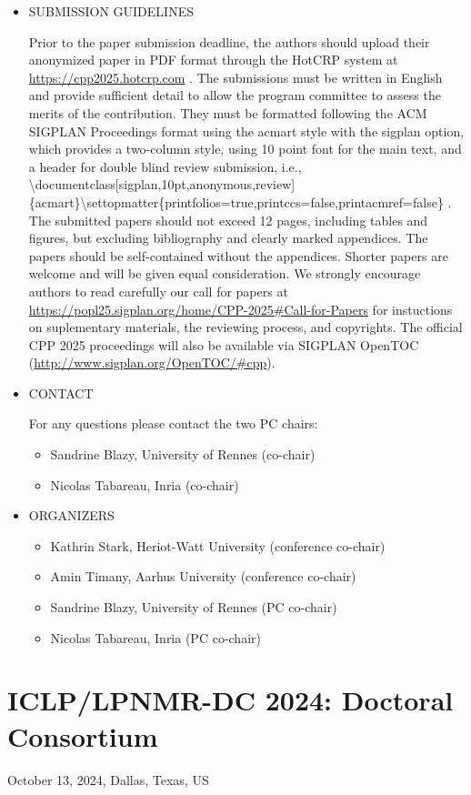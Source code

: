 \documentclass[prodmode,acmtecs]{acmsmall} %
\begin{document}
\begin{itemize}
\item  SUBMISSION GUIDELINES 
 
  Prior to the paper submission deadline, the authors should upload their anonymized paper in PDF format through the HotCRP system at \href{https://cpp2025.hotcrp.com}{https://cpp2025.hotcrp.com} . The submissions must be written in English and provide sufficient detail to allow the program committee to assess the merits of the contribution. They must be formatted following the ACM SIGPLAN Proceedings format using the acmart style with the sigplan option, which provides a two-column style, using 10 point font for the main text, and a header for double blind review submission, i.e., \textbackslash{}documentclass[sigplan,10pt,anonymous,review]\{acmart\}\textbackslash{}settopmatter\{printfolios=true,printccs=false,printacmref=false\} . The submitted papers should not exceed 12 pages, including tables and figures, but excluding bibliography and clearly marked appendices. The papers should be self-contained without the appendices. Shorter papers are welcome and will be given equal consideration. We strongly encourage authors to read carefully our call for papers at \href{https://popl25.sigplan.org/home/CPP-2025#Call-for-Papers}{https://popl25.sigplan.org/home/CPP-2025\#Call-for-Papers} for instuctions on suplementary materials, the reviewing process, and copyrights. The official CPP 2025 proceedings will also be available via SIGPLAN OpenTOC (\href{http://www.sigplan.org/OpenTOC/#cpp}{http://www.sigplan.org/OpenTOC/\#cpp}). 
 
\item  CONTACT 
 
  For any questions please contact the two PC chairs: 
 
\begin{itemize}\item  Sandrine Blazy, University of Rennes (co-chair)
\item  Nicolas Tabareau, Inria (co-chair)
\end{itemize} 
\item  ORGANIZERS 
 
\begin{itemize}\item  Kathrin Stark, Heriot-Watt University (conference co-chair)
\item  Amin Timany, Aarhus University (conference co-chair)
\item  Sandrine Blazy, University of Rennes (PC co-chair)
\item  Nicolas Tabareau, Inria (PC co-chair)
\end{itemize} 
\end{itemize}\section{ICLP/LPNMR-DC 2024: Doctoral Consortium}\label{ICLPLPNMRDC2024}  October 13, 2024, Dallas, Texas, US\\ 
\end{document}
